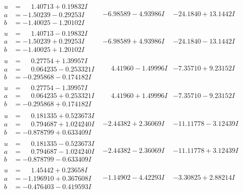 \documentclass[1p]{elsarticle_modified}
\theoremstyle{definition}
\begin{document}
$$\begin{array}{c|c|c}
\begin{aligned}
u &= \phantom{-}1.40713 + 0.19832 I \\
a &= -1.50239 - 0.29253 I \\
b &= -1.40025 - 1.20102 I\end{aligned}
 & -6.98589 - 4.93986 I & -24.1840 + 13.1442 I \\ \hline\begin{aligned}
u &= \phantom{-}1.40713 - 0.19832 I \\
a &= -1.50239 + 0.29253 I \\
b &= -1.40025 + 1.20102 I\end{aligned}
 & -6.98589 + 4.93986 I & -24.1840 - 13.1442 I \\ \hline\begin{aligned}
u &= \phantom{-}0.27754 + 1.39957 I \\
a &= \phantom{-}0.064235 - 0.253321 I \\
b &= -0.295868 - 0.174182 I\end{aligned}
 & \phantom{-}4.41960 - 1.49996 I & -7.35710 + 9.23152 I \\ \hline\begin{aligned}
u &= \phantom{-}0.27754 - 1.39957 I \\
a &= \phantom{-}0.064235 + 0.253321 I \\
b &= -0.295868 + 0.174182 I\end{aligned}
 & \phantom{-}4.41960 + 1.49996 I & -7.35710 - 9.23152 I \\ \hline\begin{aligned}
u &= \phantom{-}0.181335 + 0.523673 I \\
a &= \phantom{-}0.794687 + 1.024240 I \\
b &= -0.878799 + 0.633409 I\end{aligned}
 & -2.44382 + 2.36069 I & -11.11778 - 3.12439 I \\ \hline\begin{aligned}
u &= \phantom{-}0.181335 - 0.523673 I \\
a &= \phantom{-}0.794687 - 1.024240 I \\
b &= -0.878799 - 0.633409 I\end{aligned}
 & -2.44382 - 2.36069 I & -11.11778 + 3.12439 I \\ \hline\begin{aligned}
u &= \phantom{-}1.45442 + 0.23658 I \\
a &= -1.196910 + 0.367608 I \\
b &= -0.476403 - 0.419593 I\end{aligned}
 & -1.14902 - 4.42293 I & -3.30825 + 2.88214 I \\ \hline\begin{aligned}

\end{aligned}
\end{array}$$
\end{document}
